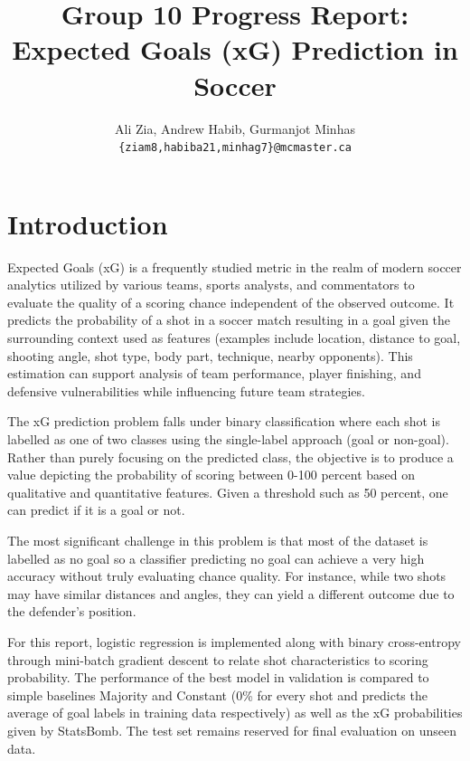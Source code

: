\documentclass[11pt]{article}
\title{Group 10 Progress Report:\\Expected Goals (xG) Prediction in Soccer}
\author{Ali Zia, Andrew Habib, Gurmanjot Minhas \\
  \texttt{\{ziam8,habiba21,minhag7\}@mcmaster.ca} }
\begin{document}
\maketitle

\section{Introduction}


Expected Goals (xG) is a frequently studied metric in the realm of modern soccer analytics utilized by various teams, sports analysts, and commentators to evaluate the quality of a scoring chance independent of the observed outcome. It predicts the probability of a shot in a soccer match resulting in a goal given the surrounding context used as features (examples include location, distance to goal, shooting angle, shot type, body part, technique, nearby opponents). This estimation can support analysis of team performance, player finishing, and defensive vulnerabilities while influencing future team strategies.

The xG prediction problem falls under binary classification where each shot is labelled as one of two classes using the single-label approach (goal or non-goal). Rather than purely focusing on the predicted class, the objective is to produce a value depicting the probability of scoring between 0-100 percent based on qualitative and quantitative features. Given a threshold such as 50 percent, one can predict if it is a goal or not.

The most significant challenge in this problem is that most of the dataset is labelled as no goal so a classifier predicting no goal can achieve a very high accuracy without truly evaluating chance quality. For instance, while two shots may have similar distances and angles, they can yield a different outcome due to the defender's position.

For this report, logistic regression is implemented along with binary cross-entropy through mini-batch gradient descent to relate shot characteristics to scoring probability. The performance of the best model in validation is compared to simple baselines Majority and Constant (0\% for every shot and predicts the average of goal labels in training data respectively) as well as the xG probabilities given by StatsBomb. The test set remains reserved for final evaluation on unseen data.
\end{document}
